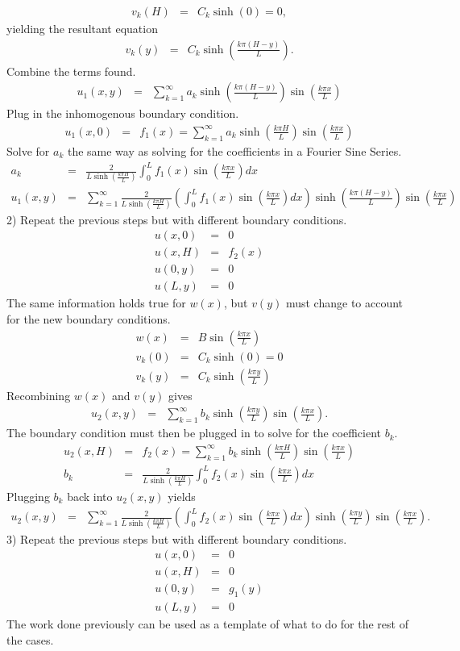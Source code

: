 \documentclass{article}
\newcommand{\bea}{\begin{eqnarray*}}
\newcommand{\eea}{\end{eqnarray*}}
\begin{document}
\bea
v_k(H) &=& C_k \sinh\left(0\right) = 0,
\eea
yielding the resultant equation
\bea
v_k(y) &=& C_k \sinh\left(\frac{k\pi (H-y)}{L}\right).
\eea
Combine the terms found.
\bea
u_1(x,y) &=& \sum_{k=1}^{\infty}{a_k}\sinh\left(\frac{k\pi (H-y)}{L}\right)\sin\left(\frac{k\pi x}{L}\right)
\eea
Plug in the inhomogenous boundary condition.
\bea
u_1(x,0) &=& f_1(x) = \sum_{k=1}^{\infty}{a_k}\sinh\left(\frac{k\pi H}{L}\right)\sin\left(\frac{k\pi x}{L}\right)
\eea
Solve for $a_k$ the same way as solving for the coefficients in a Fourier Sine Series.
\bea
a_k &=& \frac{2}{L\sinh\left(\frac{k\pi H}{L}\right)}\int_{0}^{L}{f_1(x)\sin\left(\frac{k\pi x}{L}\right)dx}\\
u_1(x,y) &=& \sum_{k=1}^{\infty}{\frac{2}{L\sinh\left(\frac{k\pi H}{L}\right)}\left(\int_{0}^{L}{f_1(x)\sin\left(\frac{k\pi x}{L}\right)dx}\right)\sinh\left(\frac{k\pi (H-y)}{L}\right)\sin\left(\frac{k\pi x}{L}\right)}
\eea
2) Repeat the previous steps but with different boundary conditions.
\bea
u(x,0) &=& 0\\
u(x,H) &=& f_2(x)\\
u(0,y) &=& 0\\
u(L,y) &=& 0
\eea
The same information holds true for $w(x)$, but $v(y)$ must change to account for the new boundary conditions.
\bea
w(x) &=& B\sin\left(\frac{k\pi x}{L}\right)\\
v_k(0) &=& C_k \sinh(0) = 0\\
v_k(y) &=& C_k \sinh\left(\frac{k\pi y}{L}\right)
\eea
Recombining $w(x)$ and $v(y)$ gives
\bea
u_2(x,y) &=& \sum_{k=1}^{\infty}{b_k}\sinh\left(\frac{k\pi y}{L}\right)\sin\left(\frac{k\pi x}{L}\right).
\eea
The boundary condition must then be plugged in to solve for the coefficient $b_k$.
\bea
u_2(x,H) &=& f_2(x) = \sum_{k=1}^{\infty}{b_k}\sinh\left(\frac{k\pi H}{L}\right)\sin\left(\frac{k\pi x}{L}\right)\\
b_k &=& \frac{2}{L\sinh\left(\frac{k\pi H}{L}\right)}\int_{0}^{L}{f_2(x)\sin\left(\frac{k\pi x}{L}\right)dx}
\eea
Plugging $b_k$ back into $u_2(x,y)$ yields
\bea
u_2(x,y) &=& \sum_{k=1}^{\infty}{\frac{2}{L\sinh\left(\frac{k\pi H}{L}\right)}\left(\int_{0}^{L}{f_2(x)\sin\left(\frac{k\pi x}{L}\right)dx}\right)\sinh\left(\frac{k\pi y}{L}\right)\sin\left(\frac{k\pi x}{L}\right)}.
\eea
3) Repeat the previous steps but with different boundary conditions.
\bea
u(x,0) &=& 0\\
u(x,H) &=& 0\\
u(0,y) &=& g_1(y)\\
u(L,y) &=& 0
\eea
The work done previously can be used as a template of what to do for the rest of the cases.
\end{document}
